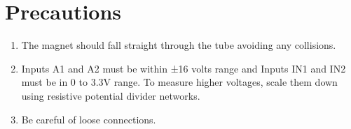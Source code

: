 \documentclass[%
 aip,
 amsmath,amssymb,
 reprint, floatfix%
]{revtex4-1}
\begin{document}
\section{Precautions}
\begin{enumerate}
    \item The magnet should fall straight through the tube avoiding any collisions.
    \item Inputs A1 and A2 must be within ±16 volts range and Inputs IN1 and IN2 must be in 0 to 3.3V range. To measure higher voltages, scale them down using resistive potential divider networks.
    \item Be careful of loose connections.
\end{enumerate}
\end{document}
